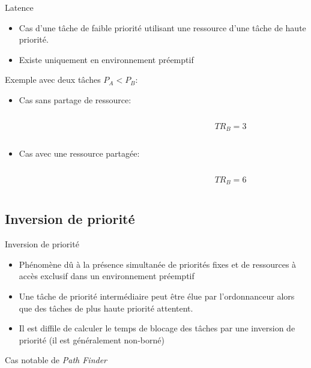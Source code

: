 \begin{frame}{Latence}
  \begin{itemize} 
  \item  Cas d'une tâche  de faible  priorité utilisant  une ressource
    d'une tâche de haute priorité.
  \item Existe uniquement en environnement préemptif
  \end{itemize} 
  Exemple avec deux tâches $P_A < P_B$:
  \begin{itemize} 
  \item Cas sans partage de ressource:
    \begin{columns}
      \begin{column}{6cm}
        \begin{center}
          
        \end{center}
      \end{column}
      \begin{column}{4cm}
        $$TR_B = 3$$
      \end{column}
    \end{columns}
  \item Cas avec une ressource partagée:
    \begin{columns}
      \begin{column}{6cm}
        \begin{center}
          
        \end{center}
      \end{column}
      \begin{column}{4cm}
        $$TR_B = 6$$
      \end{column}
    \end{columns}
  \end{itemize}     
\end{frame} 

\subsection{Inversion de priorité}

\begin{frame}{Inversion de priorité}
  \begin{itemize} 
  \item Phénomène dû à la présence simultanée de priorités fixes et de
    ressources à accès exclusif dans un environnement préemptif
  \item  Une  tâche  de  priorité  intermédiaire peut  être  élue  par
    l'ordonnanceur  alors  que  des  tâches  de  plus  haute  priorité
    attentent.
  \item Il est diffile de calculer  le temps de blocage des tâches par
    une inversion de priorité (il est généralement non-borné)
  \end{itemize} 
  Cas notable de \emph{Path Finder}
\end{frame}

